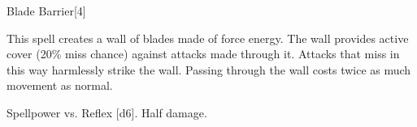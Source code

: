 \begin{spellsection}{Blade Barrier}[4]
    \begin{spellheader}
    \end{spellheader}
    \begin{spellcontent}
        \begin{spelltargetinginfo}
        \end{spelltargetinginfo}
        \begin{spelleffects}
            \spelleffect This spell creates a wall of blades made of force energy. The wall provides active cover (20\% miss chance) against attacks made through it. Attacks that miss in this way harmlessly strike the wall. Passing through the wall costs twice as much movement as normal.
            \spelldur \durshort \dismissable
        \end{spelleffects}
    \end{spellcontent}
    \begin{spellsubcontent}
        \begin{spelltargetinginfo}
        \end{spelltargetinginfo}
        \begin{spelleffects}
            \begin{spellattack}{Spellpower vs. Reflex}
                \spellsuccess {}[d6].
                \spellfailure Half damage.
            \end{spellattack}
        \end{spelleffects}
    \end{spellsubcontent}
    \begin{spellfooter}
        \miscastexplode
    \end{spellfooter}
\end{spellsection}

